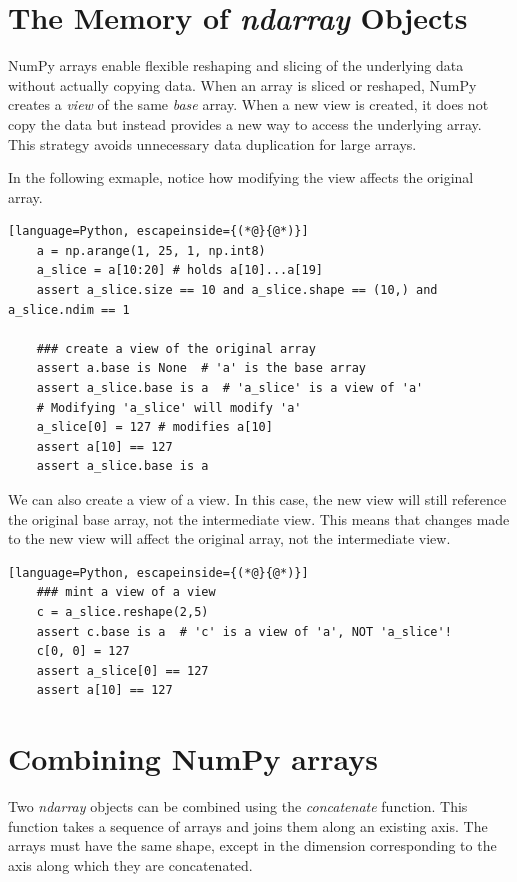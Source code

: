 \documentclass[12pt]{article}
\newcommand{\vsp}{\vspace*{8pt}}
\begin{document}
\section{The Memory of \emph{ndarray} Objects}
NumPy arrays enable flexible reshaping and slicing of the underlying data
without actually copying data. When an array is sliced or reshaped,
NumPy creates a \emph{view} of the same \emph{base} array.
When a new view is created, it does not copy the data but instead provides
a new way to access the underlying array. This strategy avoids unnecessary
data duplication for large arrays.

In the following exmaple, notice how modifying the view affects the original array.
\vsp\begin{lstlisting}[language=Python, escapeinside={(*@}{@*)}]
    a = np.arange(1, 25, 1, np.int8)
    a_slice = a[10:20] # holds a[10]...a[19]
    assert a_slice.size == 10 and a_slice.shape == (10,) and a_slice.ndim == 1

    ### create a view of the original array
    assert a.base is None  # 'a' is the base array
    assert a_slice.base is a  # 'a_slice' is a view of 'a'
    # Modifying 'a_slice' will modify 'a'
    a_slice[0] = 127 # modifies a[10]
    assert a[10] == 127
    assert a_slice.base is a
\end{lstlisting}

We can also create a view of a view. In this case, the new view will still reference
the original base array, not the intermediate view. This means that changes made
to the new view will affect the original array, not the intermediate view.

\vsp\begin{lstlisting}[language=Python, escapeinside={(*@}{@*)}]
    ### mint a view of a view
    c = a_slice.reshape(2,5)
    assert c.base is a  # 'c' is a view of 'a', NOT 'a_slice'!
    c[0, 0] = 127
    assert a_slice[0] == 127
    assert a[10] == 127
\end{lstlisting}


\section{Combining NumPy arrays}
Two \emph{ndarray} objects can be combined using the \emph{concatenate} function.
This function takes a sequence of arrays and joins them along an existing axis.
The arrays must have the same shape, except in the dimension corresponding
to the axis along which they are concatenated.
\end{document}

